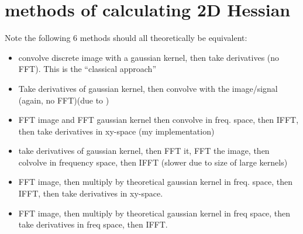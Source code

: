 

\section{methods of calculating 2D Hessian}

Note the following 6 methods should all theoretically be equivalent:

\begin{itemize}
	\item convolve discrete image with a gaussian kernel, then take derivatives (no FFT). This is the ``classical approach''
	\item Take derivatives of gaussian kernel, then convolve with the image/signal (again, no FFT)(due to )
	\item FFT image and FFT gaussian kernel then convolve in freq. space, then IFFT, then take derivatives in xy-space (my implementation)
	\item take derivatives of gaussian kernel, then FFT it,  FFT the image, then colvolve in frequency space, then  IFFT (slower due to size of large kernels)
	\item FFT image, then multiply by theoretical gaussian kernel in freq. space, then IFFT, then take derivatives in xy-space.
	\item FFT image, then multiply by theoretical gaussian kernel in freq space, then take derivatives in freq space, then IFFT.
	

\end{itemize}





